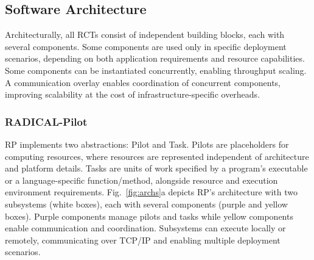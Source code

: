 \documentclass[preprint,12pt, a4paper]{elsarticle}
\begin{document}
\subsection{Software Architecture}\label{ssec:architecture}


Architecturally, all RCTs consist of independent building blocks, each with several components. Some components are used only in specific deployment scenarios, depending on both application requirements and resource capabilities. Some components can be instantiated concurrently, enabling throughput scaling. A communication overlay enables coordination of concurrent components, improving scalability at the cost of infrastructure-specific overheads.

\subsubsection{RADICAL-Pilot}\label{sssec:arch_rp}

RP implements two abstractions: Pilot and Task. Pilots are placeholders for
computing resources, where resources are represented independent of architecture
and platform details. Tasks are units of work specified by a program's
executable or a language-specific function/method, alongside resource and
execution environment requirements. Fig.~\ref{fig:archs}a depicts RP's
architecture with two subsystems (white boxes), each with several components
(purple and yellow boxes). Purple components manage pilots and tasks while
yellow components enable communication and coordination. Subsystems can execute
locally or remotely, communicating over TCP/IP and enabling multiple deployment
scenarios.
\end{document}

